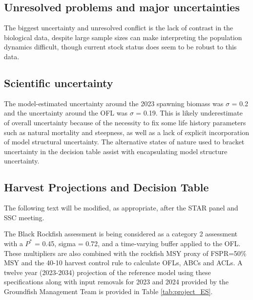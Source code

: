 \documentclass[11pt,
  english,
  letterpaper,
]{article}
\begin{document}
\hypertarget{unresolved-problems-and-major-uncertainties}{%
\subsection*{Unresolved problems and major uncertainties}\label{unresolved-problems-and-major-uncertainties}}

The biggest uncertainty and unresolved conflict is the lack of contrast in the biological data, despite large sample sizes can make interpreting the population dynamics difficult, though current stock status does seem to be robust to this data.

\hypertarget{scientific-uncertainty}{%
\subsection*{Scientific uncertainty}\label{scientific-uncertainty}}

The model-estimated uncertainty around the 2023 spawning biomass was \(\sigma\) = 0.2 and the uncertainty around the OFL was \(\sigma\) = 0.19. This is likely underestimate of overall uncertainty because of the necessity to fix some life history parameters such as natural mortality and steepness, as well as a lack of explicit incorporation of model structural uncertainty. The alternative states of nature used to bracket uncertainty in the decision table assist with encapsulating model structure uncertainty.

\hypertarget{harvest-projections-and-decision-table}{%
\subsection*{Harvest Projections and Decision Table}\label{harvest-projections-and-decision-table}}

The following text will be modified, as appropriate, after the STAR panel and SSC meeting.

The Black Rockfish assessment is being considered as a category 2 assessment with a \(P^*\) = 0.45, sigma = 0.72, and a time-varying buffer applied to the OFL. These multipliers are also combined with the rockfish MSY proxy of FSPR=50\% MSY and the 40-10 harvest control rule to calculate OFLs, ABCs and ACLs. A twelve year (2023-2034) projection of the reference model using these specifications along with input removals for 2023 and 2024 provided by the Groundfish Management Team is provided in Table \ref{tab:project_ES}.
\end{document}
